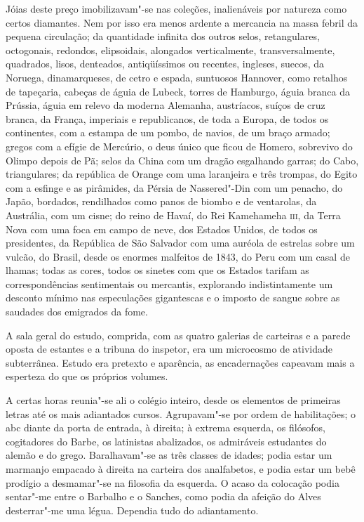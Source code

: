 Jóias deste preço
imobilizavam"-se nas coleções, inalienáveis por natureza como certos
diamantes. Nem por isso era menos ardente a mercancia na massa febril
da pequena circulação; da quantidade infinita dos outros selos,
retangulares, octogonais, redondos, elipsoidais, alongados
verticalmente, transversalmente, quadrados, lisos, denteados,
antiqüíssimos ou recentes, ingleses, suecos, da Noruega, dinamarqueses,
de cetro e espada, suntuosos Hannover, como retalhos de tapeçaria,
cabeças de águia de Lubeck, torres de Hamburgo, águia branca da
Prússia, águia em relevo da moderna Alemanha, austríacos, suíços de
cruz branca, da França, imperiais e republicanos, de toda a Europa, de
todos os continentes, com a estampa de um pombo, de navios, de um braço
armado; gregos com a efígie de Mercúrio, o deus único que ficou de
Homero, sobrevivo do Olimpo depois de Pã; selos da China com um dragão
esgalhando garras; do Cabo, triangulares; da república de Orange com
uma laranjeira e três trompas, do Egito com a esfinge e as pirâmides,
da Pérsia de Nassered"-Din com um penacho, do Japão, bordados,
rendilhados como panos de biombo e de ventarolas, da Austrália, com um
cisne; do reino de Havaí, do Rei Kamehameha \textsc{iii}, da Terra Nova com uma
foca em campo de neve, dos Estados Unidos, de todos os presidentes, da
República de São Salvador com uma auréola de estrelas sobre um vulcão,
do Brasil, desde os enormes malfeitos de 1843, do Peru com um casal de
lhamas; todas as cores, todos os sinetes com que os Estados tarifam as
correspondências sentimentais ou mercantis, explorando indistintamente
um desconto mínimo nas especulações gigantescas e o imposto de sangue
sobre as saudades dos emigrados da fome. 

A sala geral do estudo,
comprida, com as quatro galerias de carteiras e a parede oposta de
estantes e a tribuna do inspetor, era um microcosmo de atividade
subterrânea. Estudo era pretexto e aparência, as encadernações capeavam
mais a esperteza do que os próprios volumes. 

A certas horas reunia"-se
ali o colégio inteiro, desde os elementos de primeiras letras até os
mais adiantados cursos. Agrupavam"-se por ordem de habilitações; o abc
diante da porta de entrada, à direita; à extrema esquerda, os
filósofos, cogitadores do Barbe, os latinistas abalizados, os
admiráveis estudantes do alemão e do grego. Baralhavam"-se as três
classes de idades; podia estar um marmanjo empacado à direita na
carteira dos analfabetos, e podia estar um bebê prodígio a
desmamar"-se na filosofia da esquerda. O acaso da colocação podia
sentar"-me entre o Barbalho e o Sanches, como podia da afeição do
Alves desterrar"-me uma légua. Dependia tudo do adiantamento. 

